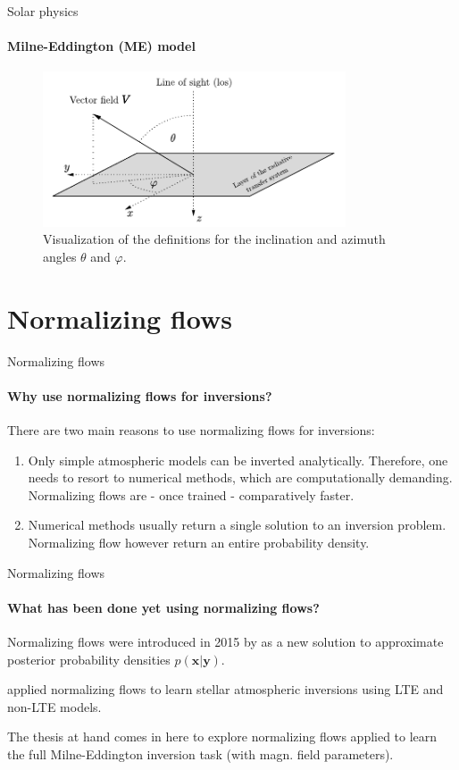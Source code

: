 \documentclass{beamer}
\newcommand\vect[1]{\ensuremath{\bm{#1}}}
\begin{document}
\begin{frame}[allowframebreaks]{Solar physics}
	\framesubtitle{Milne-Eddington (ME) model}
\begin{figure}[h]
	\centering
	\includegraphics[width=0.8\textwidth]{figures/thesis/inclinationazimuth.pdf}
	\caption{Visualization of the definitions for the inclination and azimuth angles $\theta$ and $\varphi$.}
\end{figure}
\end{frame}

\section{Normalizing flows}
\begin{frame}[allowframebreaks]{Normalizing flows}
\framesubtitle{Why use normalizing flows for inversions?}
There are two main reasons to use normalizing flows for inversions:
\begin{enumerate}
\item Only simple atmospheric models can be inverted analytically. Therefore, one needs to resort to numerical methods, which are computationally demanding. Normalizing flows are - once trained - comparatively faster.
\item Numerical methods usually return a single solution to an inversion problem. Normalizing flow however return an entire probability density.
\end{enumerate}
\end{frame}

\begin{frame}[allowframebreaks]{Normalizing flows}
	\framesubtitle{What has been done yet using normalizing flows?}
Normalizing flows were introduced in 2015 by \cite{Rezende.21.05.2015} as a new solution to approximate posterior probability densities $p(\vect{x}|\vect{y})$.

\cite{DiazBaso.2022} applied normalizing flows to learn stellar atmospheric inversions using LTE and non-LTE models.

The thesis at hand comes in here to explore normalizing flows applied to learn the full Milne-Eddington inversion task (with magn. field parameters).
\end{frame}
\end{document}
